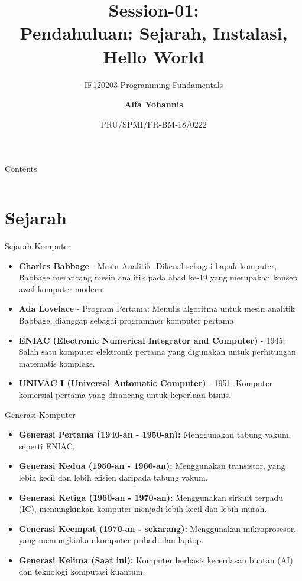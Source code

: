 \documentclass[aspectratio=169, table]{beamer}
\subtitle{IF120203-Programming Fundamentals}
\title{Session-01:\\\LARGE{Pendahuluan: Sejarah, Instalasi,\\Hello World}}
\date[Serial]{\scriptsize {PRU/SPMI/FR-BM-18/0222}}
\author[Pradita]{\small{\textbf{Alfa Yohannis}}}
\begin{document}
\frame{\titlepage}

\begin{frame}[fragile]{Contents}
\vspace{15pt}
\begin{columns}[t]
\begin{column}{.5\textwidth}
\tableofcontents[sections={1-3}]
\end{column}
\begin{column}{.5\textwidth}
\tableofcontents[sections={4-6}]
\end{column}
\end{columns}
\end{frame}


\section{Sejarah}
\begin{frame}{Sejarah Komputer}
	\begin{itemize}
		\item \textbf{Charles Babbage} - Mesin Analitik: Dikenal sebagai bapak komputer, Babbage merancang mesin analitik pada abad ke-19 yang merupakan konsep awal komputer modern.
		\item \textbf{Ada Lovelace} - Program Pertama: Menulis algoritma untuk mesin analitik Babbage, dianggap sebagai programmer komputer pertama.
		\item \textbf{ENIAC (Electronic Numerical Integrator and Computer)} - 1945: Salah satu komputer elektronik pertama yang digunakan untuk perhitungan matematis kompleks.
		\item \textbf{UNIVAC I (Universal Automatic Computer)} - 1951: Komputer komersial pertama yang dirancang untuk keperluan bisnis.
	\end{itemize}
\end{frame}

\begin{frame}{Generasi Komputer}
		\begin{itemize}
			\item \textbf{Generasi Pertama (1940-an - 1950-an):} Menggunakan tabung vakum, seperti ENIAC.
			\item \textbf{Generasi Kedua (1950-an - 1960-an):} Menggunakan transistor, yang lebih kecil dan lebih efisien daripada tabung vakum.
			\item \textbf{Generasi Ketiga (1960-an - 1970-an):} Menggunakan sirkuit terpadu (IC), memungkinkan komputer menjadi lebih kecil dan lebih murah.
			\item \textbf{Generasi Keempat (1970-an - sekarang):} Menggunakan mikroprosesor, yang memungkinkan komputer pribadi dan laptop.
			\item \textbf{Generasi Kelima (Saat ini):} Komputer berbasis kecerdasan buatan (AI) dan teknologi komputasi kuantum.
		\end{itemize}
\end{frame}
\end{document}

